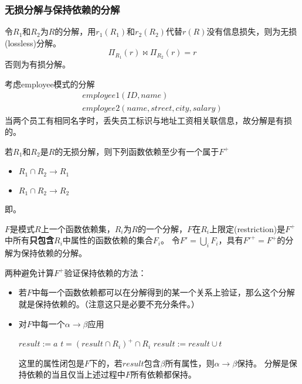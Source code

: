 \subsubsection{无损分解与保持依赖的分解}
\begin{definition}[无损分解]
令$R_1$和$R_2$为$R$的分解，用$r_1(R_1)$和$r_2(R_2)$代替$r(R)$没有信息损失，则为无损(lossless)分解。
\[\Pi_{R_1}(r)\Join\Pi_{R_2}(r)=r\]
否则为有损分解。
\end{definition}
考虑employee模式的分解
\[\begin{array}{l}
employee1 (ID,name)\\
employee2 (name,street,city,salary)
\end{array}\]
当两个员工有相同名字时，丢失员工标识与地址工资相关联信息，故分解是有损的。

\begin{theorem}
若$R_1$和$R_2$是$R$的无损分解，则下列函数依赖至少有一个属于$F^+$
\begin{itemize}
	\item $R_1\cap R_2\to R_1$
	\item $R_1\cap R_2\to R_2$
\end{itemize}
即。
\end{theorem}

\begin{definition}[保持依赖的分解]
$F$是模式$R$上一个函数依赖集，$R_i$为$R$的一个分解，$F$在$R_i$上限定(restriction)是$F^+$中所有\textbf{只包含}$R_i$中属性的函数依赖的集合$F_i$。
令$F'=\bigcup_i F_i$，具有$F'^+=F^+$的分解为保持依赖的分解。
\end{definition}

两种避免计算$F^+$验证保持依赖的方法：
\begin{itemize}
	\item 若$F$中每一个函数依赖都可以在分解得到的某一个关系上验证，那么这个分解就是保持依赖的。（注意这只是必要不充分条件。）
	\item 对$F$中每一个$\alpha\to\beta$应用
\begin{center}
\begin{algorithmic}[1]
\State $result:=a$
\Repeat
{}
\State $t=(result\cap R_i)^+\cap R_i$
\State $result :=result\cup t$
\EndFor
{}
\end{algorithmic}
\end{center}
这里的属性闭包是$F$下的，若$result$包含$\beta$所有属性，则$\alpha\to\beta$保持。
分解是保持依赖的当且仅当上述过程中$F$所有依赖都保持。
\end{itemize}

